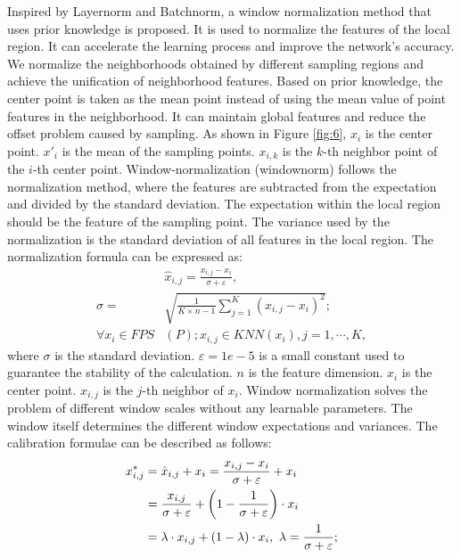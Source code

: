 \documentclass[10pt,twocolumn,letterpaper]{article}
\begin{document}
        Inspired by Layernorm and Batchnorm, a window normalization method that uses prior knowledge is proposed. It is used to normalize the features of the local region. It can accelerate the learning process and improve the network's accuracy. We normalize the neighborhoods obtained by different sampling regions and achieve the unification of neighborhood features. Based on prior knowledge, the center point is taken as the mean point instead of using the mean value of point features in the neighborhood. It can maintain global features and reduce the offset problem caused by sampling. As shown in Figure \ref{fig:6}, ${x_i}$ is the center point. ${x'_i}$ is the mean of the sampling points. ${x_{i,k}}$ is the $k$-th neighbor point of the $i$-th center point. Window-normalization (windownorm) follows the normalization method, where the features are subtracted from the expectation and divided by the standard deviation. The expectation within the local region should be the feature of the sampling point. The variance used by the normalization is the standard deviation of all features in the local region. The normalization formula can be expressed as:
        \begin{equation}
          \begin{split}
        &{\hat x_{i,j}} = \frac{{{x_{i,j}} - {x_i}}}{{\sigma  + \varepsilon }},\;\\
        \sigma = &\sqrt {\frac{1}{{K \times n - 1}}\mathop \sum \limits_{j = 1}^K {{\left( {{x_{i,j}} - {x_i}} \right)}^2}} ;\; \\
        \forall {x_i} \in FPS&\left( P \right);{x_{i,j}} \in KNN\left( {{x_i}} \right), j=1, \cdots ,K,
          \end{split}
        \end{equation}
        where $\sigma $ is the standard deviation. ${\varepsilon  = 1e - 5}$ is a small constant used to guarantee the stability of the calculation. $n$ is the feature dimension. ${{x_i}}$ is the center point. ${{x_{i,j}}}$ is the $j$-th neighbor of ${{x_i}}$. Window normalization solves the problem of different window scales without any learnable parameters. The window itself determines the different window expectations and variances. The calibration formulae can be described as follows:
        \begin{equation}
            \begin{aligned}
        x_{i,j}^* &= \hat x_{i,j} + {x_i} = {{{x_{i,j}} - {x_i}} \over {\sigma  + \varepsilon }} + {x_i}  \\
        &= {{{x_{i,j}}} \over {\sigma  + \varepsilon }} + \left( {1 - {1 \over {\sigma  + \varepsilon }}} \right) \cdot {x_i} \\
        &= \lambda \cdot {x_{i,j}} + \left( 1 - \lambda \right) \cdot {x_{i}}, \ \lambda = {1 \over {\sigma + \varepsilon}};
            \end{aligned}
        \end{equation}
\end{document}
